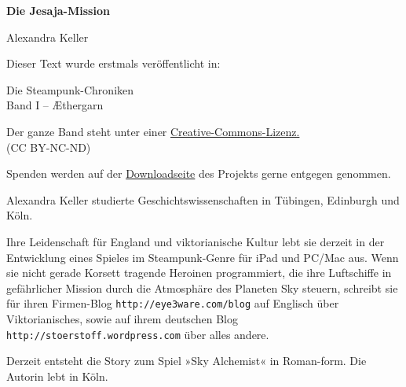 \usepackage[ngerman]{babel}
\usepackage[T1]{fontenc}




\newcommand\bigpar\medskip



\raggedbottom
\begin{center}
\textbf{\huge\textsf{Die Jesaja-Mission}}

\medskip
Alexandra Keller

\end{center}

\bigskip

\begin{flushleft}
Dieser Text wurde erstmals veröffentlicht in:
\begin{center}
Die Steampunk-Chroniken\\
Band I -- Æthergarn
\end{center}

\bigskip

Der ganze Band steht unter einer 
\href{http://creativecommons.org/licenses/by-nc-nd/2.0/de/}{Creative-Commons-Lizenz.} \\ 
(CC BY-NC-ND)

\bigskip

Spenden werden auf der 
\href{http://steampunk-chroniken.de/download}{Downloadseite}
des Projekts gerne entgegen genommen. 

\vfill

Alexandra Keller studierte Geschichtswissenschaften in Tübingen,
Edinburgh und Köln.

\bigpar

Ihre Leidenschaft für England und viktorianische Kultur lebt sie
derzeit in der Entwicklung eines Spieles im Steampunk-Genre für
iPad und PC/Mac aus. Wenn sie nicht gerade Korsett tragende
Heroinen programmiert, die ihre Luftschiffe in gefährlicher Mission
durch die Atmosphäre des Planeten Sky steuern, schreibt sie für
ihren Firmen-Blog
\texttt{http://eye3ware.com/blog} auf
Englisch über Viktorianisches, sowie auf ihrem deutschen Blog
\texttt{http://stoerstoff.wordpress.com}
über alles andere.

\bigpar

Derzeit entsteht die Story zum Spiel »Sky Alchemist« in Roman-form.
Die Autorin lebt in Köln.
\end{flushleft}

